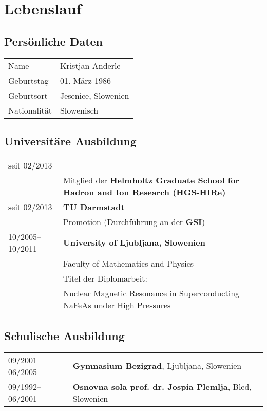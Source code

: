 
\chapter*{Lebenslauf}

\section*{Pers\"onliche Daten}
\begin{tabular}{p{}p{}}
  \hfill Name & Kristjan Anderle\\
  \hfill Geburtstag & 01. M\"{a}rz 1986\\
  \hfill Geburtsort & Jesenice, Slowenien\\
  \hfill Nationalit\"at & Slowenisch\\
\end{tabular}

\section*{Universit\"are Ausbildung}
\begin{tabular}{p{}p{}}
  \hfill seit 02/2013 \\
  & Mitglied der \textbf{Helmholtz Graduate School for Hadron and Ion Research (HGS-HIRe)} \\
  \hfill seit 02/2013 & \textbf{TU Darmstadt} \\
  & Promotion (Durchf\"uhrung an der \textbf{GSI})\\
  \hfill 10/2005--10/2011 & \textbf{University of Ljubljana, Slowenien}\\
  & Faculty of Mathematics and Physics\\
  & Titel der Diplomarbeit: \\
  & Nuclear Magnetic Resonance in Superconducting NaFeAs under High Pressures \\
\end{tabular}

\section*{Schulische Ausbildung}
\begin{tabular}{p{}p{}}
  \hfill 09/2001--06/2005 & \textbf{Gymnasium Bezigrad}, Ljubljana, Slowenien\\
  \hfill 09/1992--06/2001 & \textbf{Osnovna sola prof. dr. Jospia Plemlja}, Bled, Slowenien\\
\end{tabular}
